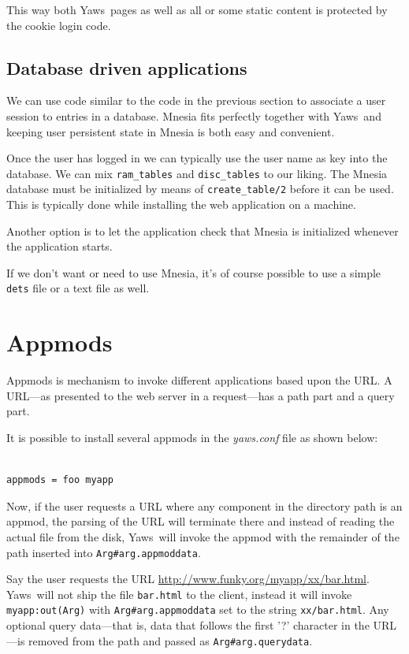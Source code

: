 \documentclass[11pt,oneside,english]{book}
\newcommand{\Yaws}            %
        {{\sc Yaws}}
\begin{document}
This way both \Yaws\  pages as well as all or some static content
is protected by the cookie login code.

\subsection{Database driven applications}

We can use code similar to the code in the previous section to associate
a user session to entries in a database. Mnesia fits perfectly
together with \Yaws\  and keeping user persistent state in Mnesia is
both easy and convenient.

Once the user has logged in we can typically use the user name as key
into the database. We can mix \verb+ram_tables+ and \verb+disc_tables+
to our liking. The Mnesia database must be initialized by means of
 \verb+create_table/2+ before it can be used. This is typically done
 while installing the web application on a machine.

Another option is to let the application check that Mnesia
is initialized whenever the application starts.

If we don't want or need to use Mnesia, it's of course possible
to use a simple \verb+dets+ file or a text file as well.

\section{Appmods}
\label{appmods}

Appmods is mechanism to invoke different applications based upon the
URL. A URL---as presented to the web server in a request---has a path
part and a query part.

It is possible to install several appmods in the \textit{yaws.conf}
file as shown below:

\begin{verbatim}

appmods = foo myapp

\end{verbatim}

Now, if the user requests a URL where any component in the
directory path is an appmod, the parsing of the URL will terminate
there and instead of reading the actual file from the disk, \Yaws\  will
invoke the appmod with the remainder of the path inserted into
\verb+Arg#arg.appmoddata+.

Say the user requests the URL
\url{http://www.funky.org/myapp/xx/bar.html}.  \Yaws\ will not ship
the file \verb+bar.html+ to the client, instead it will invoke
\verb+myapp:out(Arg)+ with \verb+Arg#arg.appmoddata+ set to the string
\verb+xx/bar.html+. Any optional query data---that is, data that
follows the first '?' character in the URL---is removed from the path
and passed as \verb+Arg#arg.querydata+.
\end{document}
